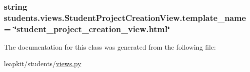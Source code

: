 \hypertarget{classstudents_1_1views_1_1_student_project_creation_view_a07eb488f8065c396ce7de30defb9cfc7}{
\subsubsection[{template\-\_\-name}]{\setlength{\rightskip}{0pt plus 5cm}string students.\-views.\-Student\-Project\-Creation\-View.\-template\-\_\-name = \char`\"{}student\-\_\-project\-\_\-creation\-\_\-view.\-html\char`\"{}\hspace{0.3cm}{\ttfamily [static]}}}\label{classstudents_1_1views_1_1_student_project_creation_view_a07eb488f8065c396ce7de30defb9cfc7}


The documentation for this class was generated from the following file\-:\begin{DoxyCompactItemize}
\item 
leapkit/students/\hyperlink{views_8py}{views.\-py}\end{DoxyCompactItemize}
